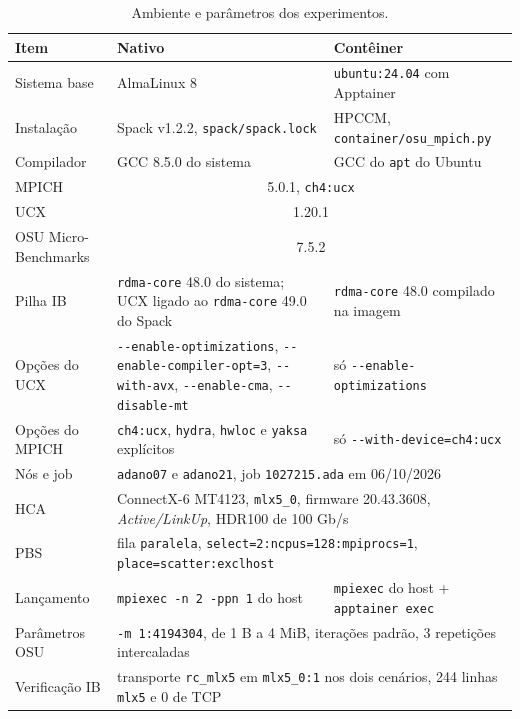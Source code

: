 \documentclass[Portugues]{ic-tese-v3}
\begin{document}
\begin{table}[!htb]
\centering\footnotesize
\renewcommand{\arraystretch}{1.05}
\begin{tabularx}{\textwidth}{|l|X|X|}
\hline
\textbf{Item} & \textbf{Nativo} & \textbf{Contêiner} \\
\hline\hline
Sistema base & AlmaLinux 8 & \texttt{ubuntu:24.04} com Apptainer \\ \hline
Instalação & Spack v1.2.2, \texttt{spack/spack.lock} & HPCCM, \texttt{container/osu\_mpich.py} \\ \hline
Compilador & GCC 8.5.0 do sistema & GCC do \texttt{apt} do Ubuntu \\ \hline
MPICH & \multicolumn{2}{c|}{5.0.1, \texttt{ch4:ucx}} \\ \hline
UCX & \multicolumn{2}{c|}{1.20.1} \\ \hline
OSU Micro-Benchmarks & \multicolumn{2}{c|}{7.5.2} \\ \hline
Pilha IB & \texttt{rdma-core} 48.0 do sistema; UCX ligado ao \texttt{rdma-core} 49.0 do Spack & \texttt{rdma-core} 48.0 compilado na imagem \\ \hline
Opções do UCX & \texttt{-{}-enable-optimizations}, \texttt{-{}-enable-compiler-opt=3}, \texttt{-{}-with-avx}, \texttt{-{}-enable-cma}, \texttt{-{}-disable-mt} & só \texttt{-{}-enable-optimizations} \\ \hline
Opções do MPICH & \texttt{ch4:ucx}, \texttt{hydra}, \texttt{hwloc} e \texttt{yaksa} explícitos & só \texttt{-{}-with-device=ch4:ucx} \\ \hline\hline
Nós e job & \multicolumn{2}{l|}{\texttt{adano07} e \texttt{adano21}, job \texttt{1027215.ada} em 06/10/2026} \\ \hline
HCA & \multicolumn{2}{l|}{ConnectX-6 MT4123, \texttt{mlx5\_0}, firmware 20.43.3608, \emph{Active/LinkUp}, HDR100 de 100 Gb/s} \\ \hline
PBS & \multicolumn{2}{l|}{fila \texttt{paralela}, \texttt{select=2:ncpus=128:mpiprocs=1}, \texttt{place=scatter:exclhost}} \\ \hline
Lançamento & \texttt{mpiexec -n 2 -ppn 1} do host & \texttt{mpiexec} do host + \texttt{apptainer exec} \\ \hline
Parâmetros OSU & \multicolumn{2}{l|}{\texttt{-m 1:4194304}, de 1 B a 4 MiB, iterações padrão, 3 repetições intercaladas} \\ \hline
Verificação IB & \multicolumn{2}{l|}{transporte \texttt{rc\_mlx5} em \texttt{mlx5\_0:1} nos dois cenários, 244 linhas \texttt{mlx5} e 0 de TCP} \\ \hline
\end{tabularx}
\caption{Ambiente e parâmetros dos experimentos.}
\label{tab:amb}
\end{table}
\end{document}
